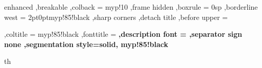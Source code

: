 {%
	enhanced
	,breakable
	,colback = myp!10
	,frame hidden
	,boxrule = 0sp
	,borderline west = {2pt}{0pt}{myp!85!black}
	,sharp corners
	,detach title
	,before upper = \tcbtitle\par\smallskip
	,coltitle = myp!85!black
	,fonttitle = \bfseries\sffamily
	,description font = \mdseries
	,separator sign none
	,segmentation style={solid, myp!85!black}
}
{th}
